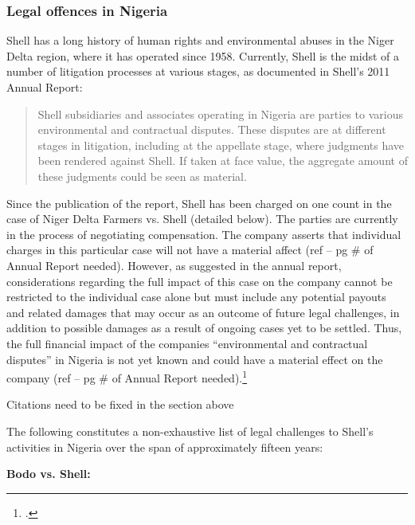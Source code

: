 	\subsubsection{Legal offences in Nigeria}



Shell has a long history of human rights and environmental abuses in the Niger Delta region, where it has operated since 1958.
Currently, Shell is the midst of a number of litigation processes at various stages, as documented in Shell's 2011 Annual Report:
\begin{quote}
Shell subsidiaries and associates operating in Nigeria are parties to various environmental and contractual disputes.
These disputes are at different stages in litigation, including at the appellate stage, where judgments have been rendered against Shell. 
If taken at face value, the aggregate amount of these judgments could be seen as material.
\end{quote}
Since the publication of the report, Shell has been charged on one count in the case of Niger Delta Farmers vs. Shell (detailed below). 
The parties are currently in the process of negotiating compensation. 
The company asserts that individual charges in this particular case will not have a material affect (ref – pg \# of Annual Report needed). 
However, as suggested in the annual report, considerations regarding the full impact of this case on the company cannot be restricted to the individual case alone but must include any potential payouts and related damages that may occur as an outcome of future legal challenges, in addition to possible damages as a result of ongoing cases yet to be settled. 
Thus, the full financial impact of the companies ``environmental and contractual disputes'' in Nigeria is not yet known and could have a material effect on the company (ref – pg \# of Annual Report needed).\footcite[][p. 139]{Shell_2011}



\begin{vcom}
	Citations need to be fixed in the section above
\end{vcom}



The following constitutes a non-exhaustive list of legal challenges to Shell's activities in Nigeria over the span of approximately fifteen years:



\textbf{Bodo vs. Shell:}



